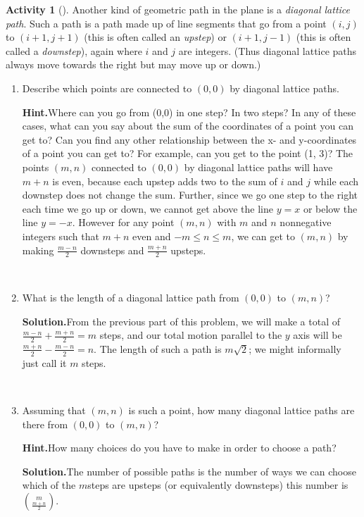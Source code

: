 \documentclass[10pt,]{book}
\theoremstyle{plain}
\theoremstyle{definition}
\newtheorem{activity}[project]{Activity}
\numberwithin{equation}{chapter}
\begin{document}
\begin{activity}[]\label{diagonallattice}
Another kind of geometric path in the plane is a \emph{diagonal lattice path}. Such a path is a path made up of line segments that go from a point \((i,j)\) to \((i+1,j+1)\) (this is often called an \emph{upstep}) or \((i+1,j-1)\) (this is often called a \emph{downstep}), again where \(i\) and \(j\) are integers. (Thus diagonal lattice paths always move towards the right but may move up or down.)%
~\par
\begin{enumerate}[label=(\alph*)]
 \item Describe which points are connected to \((0,0)\) by diagonal lattice paths.%
\par\medskip\noindent%
\textbf{Hint.}\quad Where can you go from (0,0) in one step? In two steps? In any of these cases, what can you say about the sum of the coordinates of a point you can get to? Can you find any other relationship between the x- and y-coordinates of a point you can get to? For example, can you get to the point (1, 3)?%
The points \((m,n)\) connected to \((0,0)\) by diagonal lattice paths will have \(m+n\) is even, because each upstep adds two to the sum of \(i\) and \(j\) while each downstep does not change the sum.  Further, since we go one step to the right each time we go up or down, we cannot get above the line \(y=x\) or below the line \(y=-x\). However for any point \((m,n)\) with \(m\) and \(n\) nonnegative integers such that \(m+n\) even and \(-m\le n\le m\), we can get to \((m,n)\) by making \(\frac{m-n}{2}\) downsteps and \(\frac{m+n}{2}\) upsteps.%

~\par
\item What is the length of a diagonal lattice path from \((0,0)\) to \((m,n)\)?%
\par\medskip\noindent%
\textbf{Solution.}\quad From the previous part of this problem, we will make a total of  \(\frac{m-n}{2} + \frac{m+n}{2} = m\) steps, and our total motion parallel to the \(y\) axis will be \(\frac{m+n}{2}-\frac{m-n}{2} = n\).  The length of such a path is \(m\sqrt{2}\); we might informally just call it \(m\) steps.%

~\par
\item Assuming that \((m,n)\) is such a point, how many diagonal lattice paths are there from \((0,0)\) to \((m,n)\)?%
\par\medskip\noindent%
\textbf{Hint.}\quad How many choices do you have to make in order to choose a path?%
\par\medskip\noindent%
\textbf{Solution.}\quad The number of possible paths is the number of ways we can choose which of the \(m\)steps are upsteps (or equivalently downsteps) this number is \(\binom{m}{\frac{m+n}{2}}\).%

\end{enumerate}
\end{activity}
\end{document}
